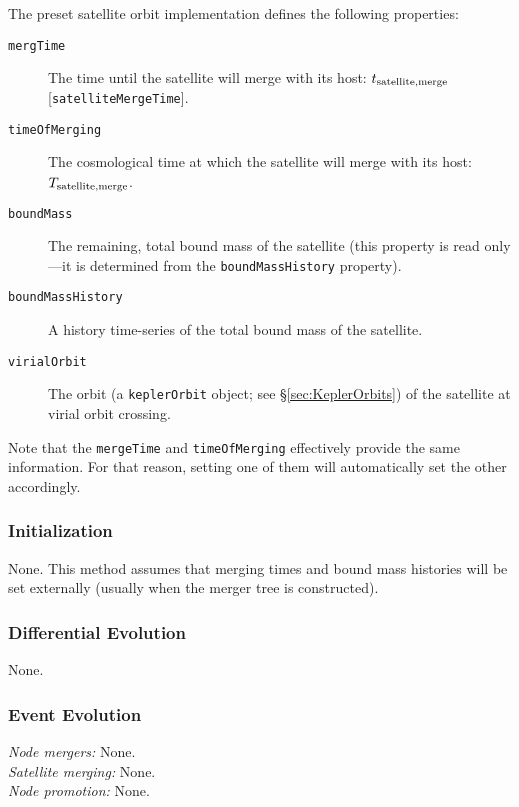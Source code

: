 The preset satellite orbit implementation defines the following properties:
\begin{description}
 \item [{\tt mergTime}] The time until the satellite will merge with its host: $t_{\rm satellite, merge}$ [{\tt satelliteMergeTime}].
 \item [{\tt timeOfMerging}] The cosmological time at which the satellite will merge with its host: $T_{\rm satellite, merge}$.
 \item [{\tt boundMass}] The remaining, total bound mass of the satellite (this property is read only---it is determined from the {\tt boundMassHistory} property).
 \item [{\tt boundMassHistory}] A history time-series of the total bound mass of the satellite.
 \item [{\tt virialOrbit}] The orbit (a {\tt keplerOrbit} object; see \S\ref{sec:KeplerOrbits}) of the satellite at virial orbit crossing.
\end{description}

Note that the {\tt mergeTime} and {\tt timeOfMerging} effectively provide the same information. For that reason, setting one of them will automatically set the other accordingly.

\subsubsection{Initialization}

None. This method assumes that merging times and bound mass histories will be set externally (usually when the merger tree is constructed).

\subsubsection{Differential Evolution}

None.

\subsubsection{Event Evolution}

\noindent\emph{Node mergers:} None.\\

\noindent\emph{Satellite merging:} None.\\

\noindent\emph{Node promotion:} None.\\

